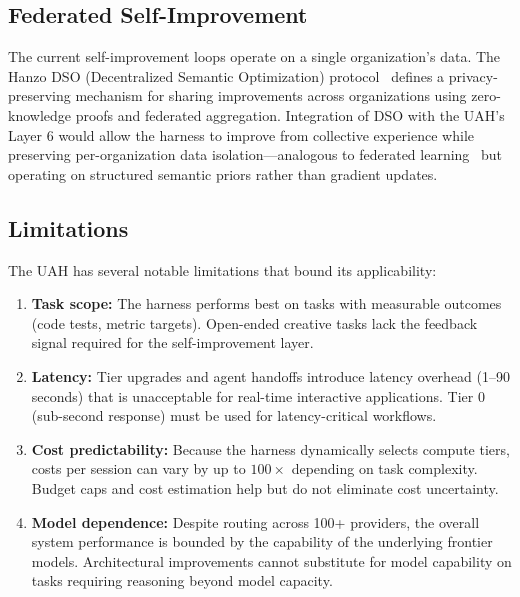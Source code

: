 \subsection{Federated Self-Improvement}

The current self-improvement loops operate on a single organization's data.
The Hanzo DSO (Decentralized Semantic Optimization) protocol~\cite{hanzo2024dso}
defines a privacy-preserving mechanism for sharing improvements across
organizations using zero-knowledge proofs and federated aggregation.
Integration of DSO with the UAH's Layer 6 would allow the harness to
improve from collective experience while preserving per-organization data
isolation---analogous to federated learning~\cite{mcmahan2017communication}
but operating on structured semantic priors rather than gradient updates.

\subsection{Limitations}

The UAH has several notable limitations that bound its applicability:

\begin{enumerate}[leftmargin=1.5em]
    \item \textbf{Task scope:} The harness performs best on tasks with
          measurable outcomes (code tests, metric targets). Open-ended creative
          tasks lack the feedback signal required for the self-improvement layer.
    \item \textbf{Latency:} Tier upgrades and agent handoffs introduce latency
          overhead (1--90 seconds) that is unacceptable for real-time
          interactive applications. Tier 0 (sub-second response) must be used
          for latency-critical workflows.
    \item \textbf{Cost predictability:} Because the harness dynamically selects
          compute tiers, costs per session can vary by up to $100\times$
          depending on task complexity. Budget caps and cost estimation help
          but do not eliminate cost uncertainty.
    \item \textbf{Model dependence:} Despite routing across 100+ providers,
          the overall system performance is bounded by the capability of the
          underlying frontier models. Architectural improvements cannot
          substitute for model capability on tasks requiring reasoning beyond
          model capacity.
\end{enumerate}

